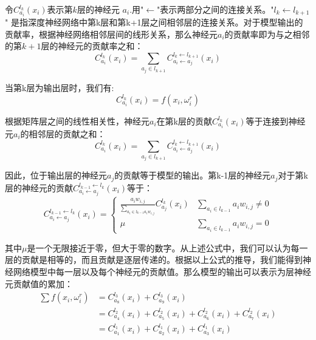 令$C_{a_{i}}^{l_{k}}\left(x_{i}\right)$表示第$k$层的神经元 $a_{i}$.用"$\leftarrow$"表示两部分之间的连接关系。"$l_{k} \leftarrow l_{k+1}$" 是指深度神经网络中第k层和第k+1层之间相邻层的连接关系。对于模型输出的贡献率，根据神经网络相邻层间的线形关系，那么神经元$a_{i}$的贡献率即为与之相邻的第$k+1$层的神经元的贡献率之和：
$$
C_{a_{i}}^{l_{k}}\left(x_{i}\right)=\sum_{a_{j} \in l_{k+1}} C_{a_{i} \leftarrow a_{j}}^{l_{k} \leftarrow l_{k+1}}\left(x_{i}\right)
$$

当第k层为输出层时，我们有:
\begin{equation}
C_{a_{i}}^{l_{k}}\left(x_{i}\right)=f\left(x_{i}, \omega_{i}^{r}\right)
\end{equation}

根据矩阵层之间的线性相关性，神经元$a_{i}$在第k层的贡献$C_{a_{i}}^{l_{k}}\left(x_{i}\right)$等于连接到神经元$a_{i}$的相邻层的贡献之和：
\begin{equation}\label{eq:层间传播1}
C_{a_{i}}^{l_{k}}\left(x_{i}\right)=\sum_{a_{j} \in l_{k+1}} C_{a_{i} \leftarrow a_{j}}^{l_{k} \leftarrow l_{k+1}}\left(x_{i}\right)
\end{equation}

因此，位于输出层的神经元$a_{j}$的贡献等于模型的输出。第k-1层的神经元$a_{j}$对于第k层的神经元的贡献$C_{a_{i} \leftarrow a_{j}}^{l_{k-1} \leftarrow l_{k}}\left(x_{i}\right)$等于：
\begin{equation}
C_{a_{i} \leftarrow a_{j}}^{l_{k-1} \leftarrow l_{k}}\left(x_{i}\right)=\left\{\begin{array}{cc}\frac{a_{i} w_{i, j}}{\sum_{a_{i} \in l_{k-1} a_{i} w_{i, j}}} C_{a_{j}}^{l_{k}}\left(x_{i}\right) & \sum_{a_{i} \in l_{k-1}} a_{i} w_{i, j} \neq 0 \\ \mu & \sum_{a_{i} \in l_{k-1}} a_{i} w_{i, j}=0\end{array}\right.
\end{equation}

其中$\mu$是一个无限接近于零，但大于零的数字。从上述公式中，我们可以认为每一层的贡献是相等的，而且贡献是逐层传递的。根据以上公式的推导，我们能得到神经网络模型中每一层以及每个神经元的贡献值。那么模型的输出可以表示为层神经元贡献值的累加：
$$
\begin{aligned}
\sum f\left(x_{i}, \omega_{i}^{r}\right) &=C_{a_{8}}^{l_{3}}\left(x_{i}\right)+C_{a_{9}}^{l_{3}}\left(x_{i}\right) \\
&=C_{a_{4}}^{l_{2}}\left(x_{i}\right)+C_{a_{5}}^{l_{2}}\left(x_{i}\right)+C_{a_{6}}^{l_{2}}\left(x_{i}\right)+C_{a_{7}}^{l_{2}}\left(x_{i}\right) \\
&=C_{a_{1}}^{l_{1}}\left(x_{i}\right)+C_{a_{2}}^{l_{1}}\left(x_{i}\right)+C_{a_{3}}^{l_{1}}\left(x_{i}\right)
\end{aligned}
$$

